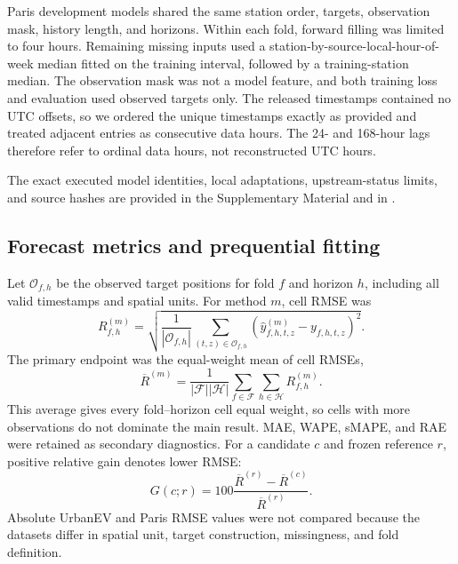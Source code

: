 Paris development models shared the same station order, targets, observation mask, history length, and horizons.  Within each fold, forward filling was limited to four hours.  Remaining missing inputs used a station-by-source-local-hour-of-week median fitted on the training interval, followed by a training-station median.  The observation mask was not a model feature, and both training loss and evaluation used observed targets only.  The released timestamps contained no UTC offsets, so we ordered the unique timestamps exactly as provided and treated adjacent entries as consecutive data hours.  The 24- and 168-hour lags therefore refer to ordinal data hours, not reconstructed UTC hours.

The exact executed model identities, local adaptations, upstream-status limits, and source hashes are provided in the Supplementary Material and in .

\subsection{Forecast metrics and prequential fitting}
\label{sec:methods-evaluation}

Let $\mathcal{O}_{f,h}$ be the observed target positions for fold $f$ and horizon $h$, including all valid timestamps and spatial units.  For method $m$, cell RMSE was
\begin{equation}
    R_{f,h}^{(m)}=
    \sqrt{\frac{1}{|\mathcal{O}_{f,h}|}
    \sum_{(t,z)\in\mathcal{O}_{f,h}}
    \left(\widehat y_{f,h,t,z}^{(m)}-y_{f,h,t,z}\right)^2}.
    \label{eq:cell-rmse}
\end{equation}
The primary endpoint was the equal-weight mean of cell RMSEs,
\begin{equation}
    \overline R^{(m)}=\frac{1}{|\mathcal{F}||\mathcal{H}|}
    \sum_{f\in\mathcal{F}}\sum_{h\in\mathcal{H}}R_{f,h}^{(m)}.
    \label{eq:macro-rmse}
\end{equation}
This average gives every fold--horizon cell equal weight, so cells with more observations do not dominate the main result.  MAE, WAPE, sMAPE, and RAE were retained as secondary diagnostics.  For a candidate $c$ and frozen reference $r$, positive relative gain denotes lower RMSE:
\begin{equation}
    G(c;r)=100\frac{\overline R^{(r)}-\overline R^{(c)}}
    {\overline R^{(r)}}.
    \label{eq:relative-gain}
\end{equation}
Absolute UrbanEV and Paris RMSE values were not compared because the datasets differ in spatial unit, target construction, missingness, and fold definition.

